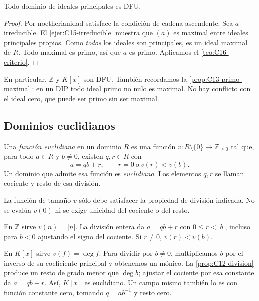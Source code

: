 \begin{prop}\label{prop:C16-DIP}
Todo dominio de ideales principales es DFU.
\end{prop}
\begin{proof}
Por noetherianidad satisface la condición de cadena ascendente. Sea $a$ irreducible. El \cref{ejer:C15-irreducible} muestra que $(a)$ es maximal entre ideales principales propios. Como \emph{todos} los ideales son principales, es un ideal maximal de $R$. Todo maximal es primo, así que $a$ es primo. Aplicamos el \cref{teo:C16-criterio}.
\end{proof}
En particular, $\mathbb Z$ y $K[x]$ son DFU. También recordamos la \cref{prop:C13-primo-maximal}: en un DIP todo ideal primo no nulo es maximal. No hay conflicto con el ideal cero, que puede ser primo sin ser maximal.

\subsection{Dominios euclidianos}
\begin{defi}
Una \emph{función euclidiana} en un dominio $R$ es una función $v:R\setminus\{0\}\to\mathbb Z_{\geq0}$ tal que, para todo $a\in R$ y $b\ne0$, existen $q,r\in R$ con
\[
a=qb+r,\qquad r=0\ \text{o}\ v(r)<v(b).
\]
Un dominio que admite esa función es \emph{euclidiano}. Los elementos $q,r$ se llaman cociente y resto de esa división.
\end{defi}
La función de tamaño $v$ sólo debe satisfacer la propiedad de división indicada. No se evalúa $v(0)$ ni se exige unicidad del cociente o del resto.

\begin{ejem}
En $\mathbb Z$ sirve $v(n)=|n|$. La división entera da $a=qb+r$ con $0\leq r<|b|$, incluso para $b<0$ ajustando el signo del cociente. Si $r\ne0$, $v(r)<v(b)$.

En $K[x]$ sirve $v(f)=\deg f$. Para dividir por $b\ne0$, multiplicamos $b$ por el inverso de su coeficiente principal y obtenemos un mónico. La \cref{prop:C12-division} produce un resto de grado menor que $\deg b$; ajustar el cociente por esa constante da $a=qb+r$. Así, $K[x]$ es euclidiano. Un campo mismo también lo es con función constante cero, tomando $q=ab^{-1}$ y resto cero.
\end{ejem}

